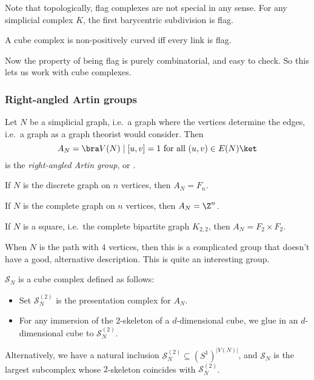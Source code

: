 \documentclass[a4paper]{article}
\begin{document}
Note that topologically, flag complexes are not special in any sense. For any simplicial complex $K$, the first barycentric subdivision is flag.

\begin{thm}[Gromov]
  A cube complex is non-positively curved iff every link is flag.
\end{thm}
Now the property of being flag is purely combinatorial, and easy to check. So this lets us work with cube complexes.

\subsubsection*{Right-angled Artin groups}
\begin{defi}
  Let $N$ be a simplicial graph, i.e.\ a graph where the vertices determine the edges, i.e.\ a graph as a graph theorist would consider. Then
  \[
    A_N = \bra V(N) \mid [u, v] = 1 \text{ for all } (u, v) \in E(N)\ket
  \]
  is the \emph{right-angled Artin group}, or .
\end{defi}

\begin{eg}
  If $N$ is the discrete graph on $n$ vertices, then $A_N = F_n$.
\end{eg}

\begin{eg}
  If $N$ is the complete graph on $n$ vertices, then $A_N = \Z^n$.
\end{eg}

\begin{eg}
  If $N$ is a square, i.e.\ the complete bipartite graph $K_{2, 2}$, then $A_N = F_2 \times F_2$.
\end{eg}

\begin{eg}
  When $N$ is the path with $4$ vertices, then this is a complicated group that doesn't have a good, alternative description. This is quite an interesting group.
\end{eg}

\begin{defi}
  $\mathcal{S}_N$ is a cube complex defined as follows:
  \begin{itemize}
    \item Set $\mathcal{S}_N^{(2)}$ is the presentation complex for $A_N$.
    \item For any immersion of the $2$-skeleton of a $d$-dimensional cube, we glue in an $d$-dimensional cube to $\mathcal{S}_N^{(2)}$.
  \end{itemize}
  Alternatively, we have a natural inclusion $\mathcal{S}_N^{(2)} \subseteq (S^1)^{|V(N)|}$, and $\mathcal{S}_N$ is the largest subcomplex whose $2$-skeleton coincides with $\mathcal{S}_N^{(2)}$.
\end{defi}
\end{document}
